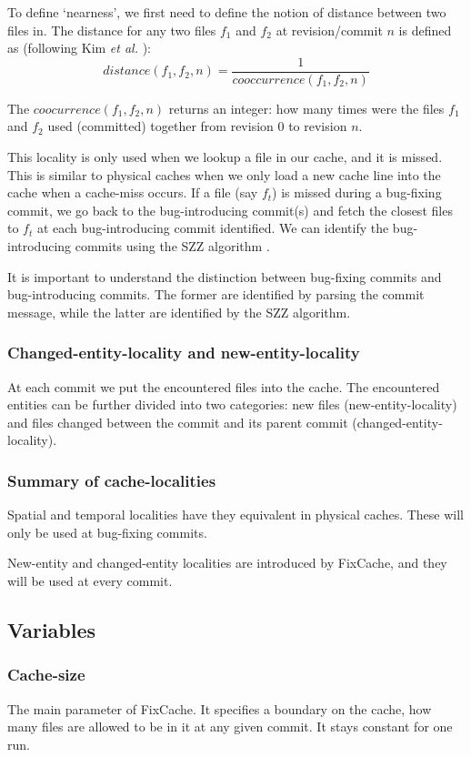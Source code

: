 \documentclass[12pt,twoside,notitlepage]{report}
\newcommand{\fxch}{FixCache}
\newcommand{\etal}{\textit{et al.}}
\begin{document}
To define `nearness', we first need to define the notion of distance between two files in. The distance  for any two files $f_1$ and $f_2$ at revision/commit $n$ is defined as (following Kim \etal{} \cite{FixCache}):
\vspace{0.2in}
\[
	distance(f_1, f_2, n) = \frac{1}{cooccurrence(f_1, f_2, n)}
\]

\vspace{0.2in}
The $coocurrence(f_1, f_2, n)$ returns an integer: how many times were the files $f_1$ and $f_2$ used (committed) together from revision $0$ to revision $n$.

This locality is only used when we lookup a file in our cache, and it is missed. This is similar to physical caches when we only load a new cache line into the cache when a cache-miss occurs. If a file (say $f_t$) is missed during a bug-fixing commit, we go back to the bug-introducing commit(s) and fetch the closest files to $f_t$ at each bug-introducing commit identified. We can identify the bug-introducing commits using the SZZ algorithm \cite{SZZ}.

It is important to understand the distinction between bug-fixing commits and bug-introducing commits. The former are identified by parsing the commit message, while the latter are identified by the SZZ algorithm.

\subsubsection{Changed-entity-locality and new-entity-locality}
At each commit we put the encountered files into the cache. The encountered entities can be further divided into two categories: new files (new-entity-locality) and files changed between the commit and its parent commit (changed-entity-locality).
\subsubsection{Summary of cache-localities}
Spatial and temporal localities have they equivalent in physical caches. These will only be used at bug-fixing commits.

New-entity and changed-entity localities are introduced by \fxch{}, and they will be used at every commit.
\subsection{Variables}\label{variables}
\subsubsection{Cache-size}
The main parameter of \fxch{}. It specifies a boundary on the cache, how many files are allowed to be in it at any given commit. It stays constant for one run.
\end{document}
